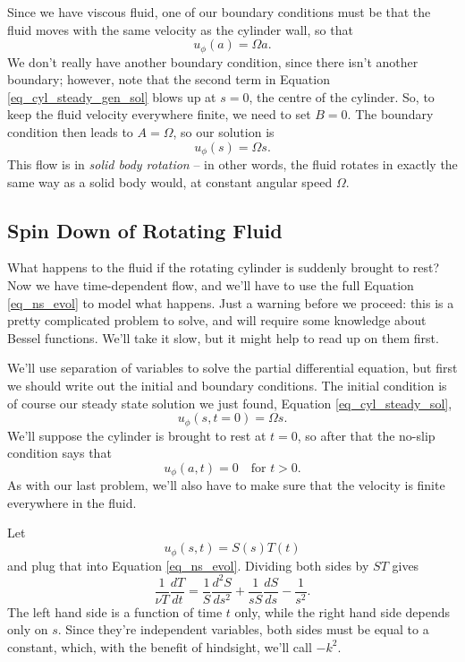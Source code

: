 Since we have viscous fluid, one of our boundary conditions must be that the fluid moves with the same velocity as the cylinder wall, so that
\[
u_\phi(a) = \Omega a.
\]
We don't really have another boundary condition, since there isn't another boundary; however, note that the second term in Equation \ref{eq_cyl_steady_gen_sol} blows up at $s=0$, the centre of the cylinder.  So, to keep the fluid velocity everywhere finite, we need to set $B = 0$.  The boundary condition then leads to $A = \Omega$, so our solution is 
\begin{equation}
\label{eq_cyl_steady_sol}
u_\phi (s) = \Omega s.
\end{equation}
This flow is in \emph{solid body rotation} -- in other words, the fluid rotates in exactly the same way as a solid body would, at constant angular speed $\Omega$.



\subsection{Spin Down of Rotating Fluid}

What happens to the fluid if the rotating cylinder is suddenly brought to rest?  Now we have time-dependent flow, and we'll have to use the full Equation \ref{eq_ns_evol} to model what happens.  Just a warning before we proceed:  this is a pretty complicated problem to solve, and will require some knowledge about Bessel functions.  We'll take it slow, but it might help to read up on them first.

We'll use separation of variables to solve the partial differential equation, but first we should write out the initial and boundary conditions.  The initial condition is of course our steady state solution we just found, Equation \ref{eq_cyl_steady_sol},
\begin{equation}
\label{eq_spin_ic}
u_\phi (s, t=0) = \Omega s.
\end{equation}
We'll suppose the cylinder is brought to rest at $t=0$, so after that the no-slip condition says that
\begin{equation}
u_\phi(a, t) = 0 \quad \text{for } t > 0.
\end{equation}
As with our last problem, we'll also have to make sure that the velocity is finite everywhere in the fluid.

Let
\[
u_\phi(s, t) = S(s) T(t)
\]
and plug that into Equation \ref{eq_ns_evol}.  Dividing both sides by $ST$ gives
\[
\frac{1}{\nu T} \frac{dT}{dt} = \frac{1}{S} \frac{d^2S}{ds^2} + \frac{1}{sS} \frac{dS}{ds} - \frac{1}{s^2}.
\]
The left hand side is a function of time $t$ only, while the right hand side depends only on $s$.  Since they're independent variables, both sides must be equal to a constant, which, with the benefit of hindsight, we'll call $-k^2$.

